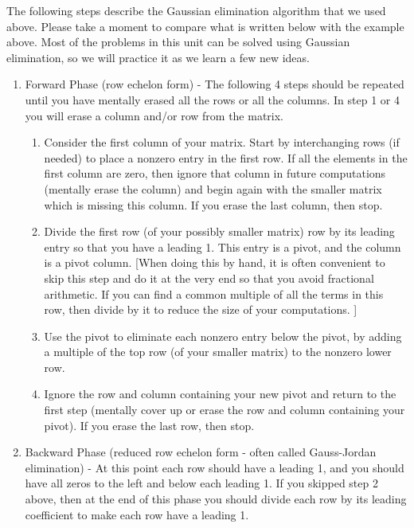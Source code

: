 The following steps describe the Gaussian elimination algorithm that we used above. 
Please take a moment to compare what is written below with the example above. 
Most of the problems in this unit can be solved using Gaussian elimination, so we will practice it as we learn a few new ideas.
\begin{enumerate}
\item Forward Phase (row echelon form) - The following 4 steps should be repeated until you have mentally erased all the rows or all the columns. In step 1 or 4 you will erase a column and/or row from the matrix.
\begin{enumerate}
	\item  
Consider the first column of your matrix. Start by interchanging rows (if needed) to place a nonzero entry in the first row. If all the elements in the first column are zero, then ignore that column in future computations (mentally erase the column) and begin again with the smaller matrix which is missing this column. If you erase the last column, then stop.
  \item 
  Divide the first row (of your possibly smaller matrix) row by its leading entry so that you have a leading 1. This entry is a pivot, and the column is a pivot column. [When doing this by hand, it is often convenient to skip this step and do it at the very end so that you avoid fractional arithmetic. If you can find a common multiple of all the terms in this row, then divide by it to reduce the size of your computations.  ] 
	\item Use the pivot to eliminate each nonzero entry below the pivot, by adding a multiple of the top row (of your smaller matrix) to the nonzero lower row.
	\item 
	Ignore the row and column containing your new pivot and return to the first step (mentally cover up or erase the row and column containing your pivot). If you erase the last row, then stop.
\end{enumerate}
	\item Backward Phase (reduced row echelon form - often called Gauss-Jordan elimination) - At this point each row should have a leading 1, and you should have all zeros to the left and below each leading 1. If you skipped step 2 above, then at the end of this phase you should divide each row by its leading coefficient to make each row have a leading 1.

\end{enumerate}
